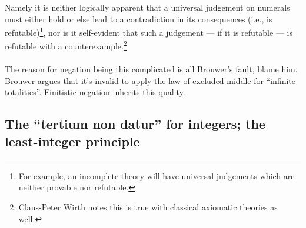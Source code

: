 Namely it is neither logically apparent that a universal judgement on
numerals must either hold or else lead to a contradiction in its
consequences (i.e., is refutable)\footnote{For example, an incomplete
theory will have universal judgements which are neither provable nor refutable.}, nor is it self-evident that such a
judgement --- if it is refutable --- is refutable with a
counterexample.\footnote{Claus-Peter Wirth notes this is true with
classical axiomatic theories as well.}

\paragraph{} %
The reason for negation being this complicated is all Brouwer's fault,
blame him. Brouwer argues that it's invalid to apply the law of
excluded middle for ``infinite totalities''. Finitistic negation
inherits this quality.

\subsection{The ``tertium non datur'' for integers; the least-integer principle}

\paragraph{} %

\paragraph{} %

\paragraph{} %

\paragraph{} %

\paragraph{} %

\paragraph{} %

\paragraph{} %

